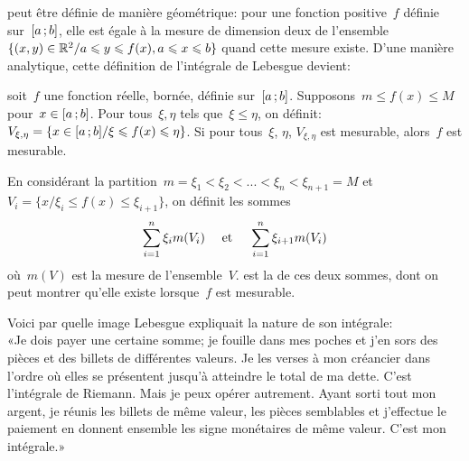 \begin{histoire}
 peut être définie de manière géométrique: pour une fonction positive~$f$ définie sur~$\mathopen{[}a\,;b\mathclose{]}$, elle est égale à la mesure de dimension deux de l'ensemble $\{(x,y)\in\mathbb R^2 / a\leqslant y\leqslant f(x), a\leqslant x\leqslant b\}$ quand cette mesure existe.
D'une manière analytique, cette définition de l'intégrale de Lebesgue devient:

\begin{definition}
soit~$f$ une fonction réelle, bornée, définie sur~$\mathopen{[}a\,;b\mathclose{]}$.
Supposons~$m\le f(x)\le M$ pour~$x\in\mathopen{[}a\,;b\mathclose{]}$.
Pour tous~$\xi, \eta$ tels que~$\xi\le\eta$, on définit:
$V_{\xi,\eta}=\{x\in\mathopen{[}a\,;b\mathclose{]}/ \xi\leqslant f(x)\leqslant\eta\}$.
Si pour tous~$\xi$, $\eta$, $V_{\xi,\eta}$ est mesurable, alors~$f$ est mesurable.

En considérant la partition~$m=\xi_1<\xi_2<...<\xi_n<\xi_{n+1}=M$ et
$V_i=\{x/ \xi_i\le f(x)\le\xi_{i+1}\}$, on définit les sommes
\begin{equation} \displaystyle\sum_{i=1}^n\xi_i m(V_i) \quad \text{ et }\quad \displaystyle\sum_{i=1}^n\xi_{i+1} m(V_i) \end{equation}
où~$m(V)$ est la mesure de l'ensemble~$V$.
 est la  de ces deux sommes, dont on peut montrer qu'elle existe lorsque~$f$ est mesurable.
\end{definition}

Voici par quelle image Lebesgue expliquait la nature de son intégrale:\\
«Je dois payer une certaine somme; je fouille dans mes poches et j'en sors des pièces et des billets de différentes valeurs. Je les verses à mon créancier dans l'ordre où elles se présentent jusqu'à atteindre le total de ma dette. C'est l'intégrale de Riemann. Mais je peux opérer autrement. Ayant sorti tout mon argent, je réunis les billets de même valeur, les pièces semblables et j'effectue le paiement en donnent ensemble les signe monétaires de même valeur. C'est mon intégrale.»


\end{histoire}
